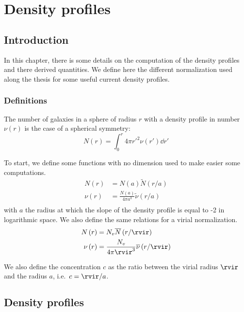 \chapter{Density profiles}
\label{cha:profiles}

\section{Introduction}

In this chapter, there is some details on the computation of the density
profiles and there derived quantities. We define here the different
normalization used along the thesis for some useful current density
profiles.

\subsection{Definitions}

The number of galaxies in a sphere of radius $r$ with a density profile in
number $\nu(r)$ is the case of a spherical symmetry:
%
\begin{equation}
    N\left(r\right)=\int_0^r4\pi {r'}^2 \nu(r')\dd{r'}
\end{equation}

To start, we define some functions with no dimension used to make easier some
computations.
%
\begin{eqnarray}
    N\left(r\right)&=N\left(a\right){\widetilde{N}\left(r/a\right)}\nonumber\\
    \nu\left(r\right)&=
        \frac{N\left(a\right)}{4\pi{a^3}}
        \widetilde\nu\left(r/a\right)\nonumber\\
\end{eqnarray}
%
with $a$ the radius at which the slope of the density profile is equal to
-2 in logarithmic space. We also define the same relations for a virial
normalization.
%
\begin{eqnarray}
    N\left(r\right)&={N_v}{\overline{N}\left(r/\rvir\right)}\nonumber\\
    \nu\left(r\right)&=
        \frac{N_v}{4\pi\rvir^3}\overline\nu\left(r/\rvir\right)\nonumber\\
\end{eqnarray}

We also define the concentration $c$ as the ratio between the virial radius
$\rvir$ and the radius $a$, i.e.\ $c=\rvir/a$.

\section{Density profiles}
\label{sec:density_profiles}

